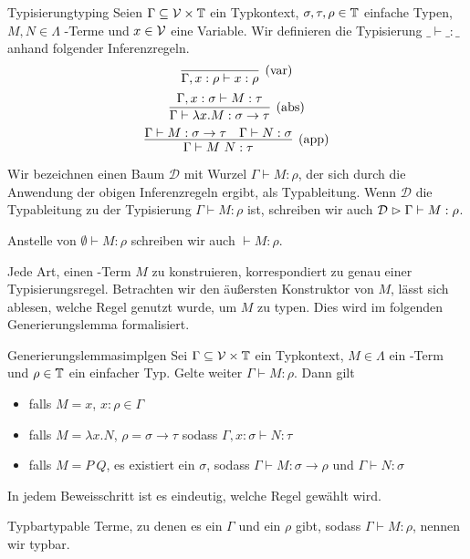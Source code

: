 \begin{definition}{Typisierung}{typing}
    Seien $\Gamma\subseteq\mathcal{V}\times\mathbb{T}$ ein Typkontext, $\sigma,\tau,\rho\in\mathbb{T}$ einfache Typen, $M, N\in\Lambda$ \tlambda-Terme und $x\in\mathcal{V}$ eine Variable. Wir definieren die Typisierung $\_ \vdash \_ : \_$ anhand folgender Inferenzregeln.
  \[\infer[\var]{\Gamma,x:\rho\vdash x : \rho}{}\]
  \[\infer[\abs]{\Gamma\vdash\lambda x.M : \sigma\to\tau}{\Gamma, x:\sigma\vdash M:\tau}\]
  \[\infer[\app]{\Gamma\vdash M~N :\tau}{\Gamma\vdash M : \sigma\to\tau&\Gamma\vdash N : \sigma}\]
  
  Wir bezeichnen einen Baum $\mathcal{D}$ mit Wurzel $\Gamma\vdash M : \rho$, der sich durch die Anwendung der obigen Inferenzregeln ergibt, als Typableitung. Wenn $\mathcal{D}$ die Typableitung zu der Typisierung $\Gamma\vdash M : \rho$ ist, schreiben wir auch $\mathcal{D}\vartriangleright\Gamma\vdash M:\rho$.
  
\end{definition}
\begin{notation}
    Anstelle von $\emptyset\vdash M : \rho$ schreiben wir auch $\vdash M:\rho$.
\end{notation}

Jede Art, einen \tlambda-Term $M$ zu konstruieren, korrespondiert zu genau einer Typisierungsregel. Betrachten wir den äußersten Konstruktor von $M$, lässt sich ablesen, welche Regel genutzt wurde, um $M$ zu typen. Dies wird im folgenden Generierungslemma formalisiert.

\begin{lemma}{Generierungslemma}{simplgen}
    Sei $\Gamma\subseteq\mathcal{V}\times\mathbb{T}$ ein Typkontext, $M\in\Lambda$ ein \tlambda-Term und $\rho\in\mathbb{T}$ ein einfacher Typ. Gelte weiter $\Gamma\vdash M:\rho$. Dann gilt
    \begin{itemize}
        \item falls $M = x$, $x : \rho\in\Gamma$
        \item falls $M = \lambda x.N$, $\rho = \sigma\to\tau$ sodass $\Gamma, x:\sigma\vdash N:\tau$
        \item falls $M = P~Q$, es existiert ein $\sigma$, sodass $\Gamma\vdash M:\sigma\to\rho$ und $\Gamma\vdash N:\sigma$
    \end{itemize}
    \Proof
    In jedem Beweisschritt ist es eindeutig, welche Regel gewählt wird. 
\end{lemma}

\begin{definition}{Typbar}{typable}
Terme, zu denen es ein $\Gamma$ und ein $\rho$ gibt, sodass $\Gamma\vdash M : \rho$, nennen wir typbar.
\end{definition}


